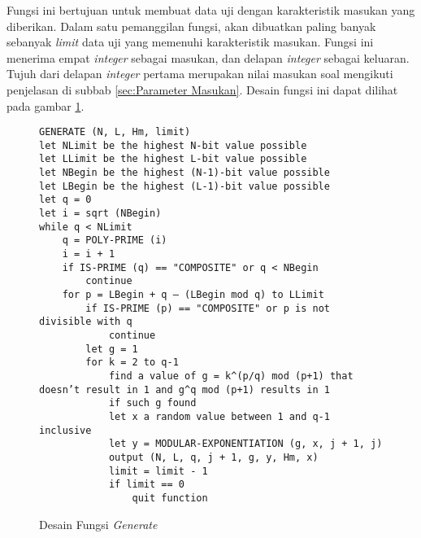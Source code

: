 Fungsi ini bertujuan untuk membuat data uji dengan karakteristik masukan yang diberikan. Dalam satu pemanggilan fungsi, akan dibuatkan paling banyak sebanyak \textit{limit} data uji yang memenuhi karakteristik masukan. Fungsi ini menerima empat \textit{integer} sebagai masukan, dan delapan \textit{integer} sebagai keluaran. Tujuh dari delapan \textit{integer} pertama merupakan nilai masukan soal mengikuti penjelasan di subbab \ref{sec:Parameter Masukan}. Desain fungsi ini dapat dilihat pada gambar \ref{psdo:generate}.
\begin{figure}[h!]
\begin{lstlisting}[firstnumber=0]
GENERATE (N, L, Hm, limit)
let NLimit be the highest N-bit value possible
let LLimit be the highest L-bit value possible
let NBegin be the highest (N-1)-bit value possible
let LBegin be the highest (L-1)-bit value possible
let q = 0
let i = sqrt (NBegin)
while q < NLimit
	q = POLY-PRIME (i)
	i = i + 1
	if IS-PRIME (q) == "COMPOSITE" or q < NBegin
		continue
	for p = LBegin + q – (LBegin mod q) to LLimit
		if IS-PRIME (p) == "COMPOSITE" or p is not divisible with q
			continue
		let g = 1
		for k = 2 to q-1
			find a value of g = k^(p/q) mod (p+1) that doesn’t result in 1 and g^q mod (p+1) results in 1
			if such g found
			let x a random value between 1 and q-1 inclusive
			let y = MODULAR-EXPONENTIATION (g, x, j + 1, j)
			output (N, L, q, j + 1, g, y, Hm, x)
			limit = limit - 1
			if limit == 0
				quit function
\end{lstlisting}
\caption{Desain Fungsi \textit{Generate}}
\label{psdo:generate}
\end{figure}